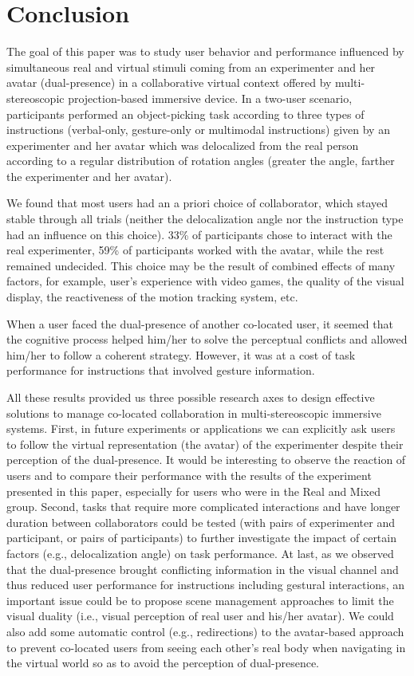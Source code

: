 \section{Conclusion}
The goal of this paper was to study user behavior and performance influenced by simultaneous real and virtual stimuli coming from an experimenter and her avatar (dual-presence) in a collaborative virtual context offered by multi-stereoscopic projection-based immersive device. In a two-user scenario, participants performed an object-picking task according to three types of instructions (verbal-only, gesture-only or multimodal instructions) given by an experimenter and her avatar which was delocalized from the real person according to a regular distribution of rotation angles (greater the angle, farther the experimenter and her avatar).

We found that most users had an a priori choice of collaborator, which stayed stable through all trials (neither the delocalization angle nor the instruction type had an influence on this choice). 33\% of participants chose to interact with the real experimenter, 59\% of participants worked with the avatar, while the rest remained undecided. This choice may be the result of combined effects of many factors, for example, user's experience with video games, the quality of the visual display, the reactiveness of the motion tracking system, etc.

When a user faced the dual-presence of another co-located user, it seemed that the cognitive process helped him/her to solve the perceptual conflicts and allowed him/her to follow a coherent strategy. However, it was at a cost of task performance for instructions that involved gesture information.

All these results provided us three possible research axes to design effective solutions to manage co-located collaboration in multi-stereoscopic immersive systems. First, in future experiments or applications we can explicitly ask users to follow the virtual representation (the avatar) of the experimenter despite their perception of the dual-presence. It would be interesting to observe the reaction of users and to compare their performance with the results of the experiment presented in this paper, especially for users who were in the Real and Mixed group. Second, tasks that require more complicated interactions and have longer duration between collaborators could be tested (with pairs of experimenter and participant, or pairs of participants) to further investigate the impact of certain factors (e.g., delocalization angle) on task performance. At last, as we observed that the dual-presence brought conflicting information in the visual channel and thus reduced user performance for instructions including gestural interactions, an important issue could be to propose scene management approaches to limit the visual duality (i.e., visual perception of real user and his/her avatar). We could also add some automatic control (e.g., redirections) to the avatar-based approach to prevent co-located users from seeing each other's real body when navigating in the virtual world so as to avoid the perception of dual-presence.
